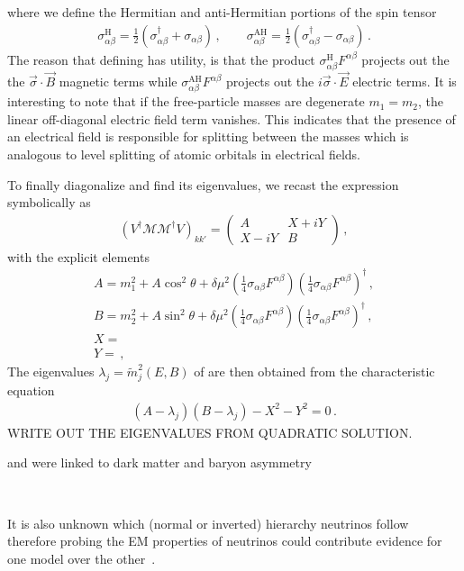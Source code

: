 where we define the Hermitian and anti-Hermitian portions of the spin tensor
\begin{align}
    \label{antiherm:1}
    \sigma_{\alpha\beta}^\mathrm{H}=\frac{1}{2}\left(\sigma_{\alpha\beta}^{\dag} + \sigma_{\alpha\beta}\right)\,,\qquad
    \sigma_{\alpha\beta}^\mathrm{AH}=\frac{1}{2}\left(\sigma_{\alpha\beta}^{\dag} - \sigma_{\alpha\beta}\right)\,.
\end{align}
The reason that defining  has utility, is that the product $\sigma_{\alpha\beta}^\mathrm{H}F^{\alpha\beta}$ projects out the the $\vec{\sigma}\cdot\vec{B}$ magnetic terms while $\sigma_{\alpha\beta}^\mathrm{AH}F^{\alpha\beta}$ projects out the $i\vec{\sigma}\cdot\vec{E}$ electric terms. It is interesting to note that if the free-particle masses are degenerate $m_{1}=m_{2}$, the linear off-diagonal electric field term vanishes. This indicates that the presence of an electrical field is responsible for splitting between the masses which is analogous to level splitting of atomic orbitals in electrical fields.

To finally diagonalize  and find its eigenvalues, we recast the expression symbolically as
\begin{align}
    \label{hermz:5}
    (V^{\dag}\mathcal{M}\mathcal{M}^{\dag}V)_{kk'} =
    \begin{pmatrix}
        A & X+iY\\
        X-iY & B
    \end{pmatrix}\,,
\end{align}
with the explicit elements
\begin{align}
    A = m_{1}^{2}+A\cos^{2}\theta+\delta\mu^{2}\left(\frac{1}{4}\sigma_{\alpha\beta}F^{\alpha\beta}\right)\left(\frac{1}{4}\sigma_{\alpha\beta}F^{\alpha\beta}\right)^{\dag}\,,\\
    B = m_{2}^{2}+A\sin^{2}\theta+\delta\mu^{2}\left(\frac{1}{4}\sigma_{\alpha\beta}F^{\alpha\beta}\right)\left(\frac{1}{4}\sigma_{\alpha\beta}F^{\alpha\beta}\right)^{\dag}\,,\\
    X = \\
    Y =\,,
\end{align}
The eigenvalues $\lambda_{j}=\widetilde m_{j}^{2}(E,B)$ of  are then obtained from the characteristic equation
\begin{align}
    (A-\lambda_{j})(B-\lambda_{j})-X^{2}-Y^{2}=0\,.
\end{align}
WRITE OUT THE EIGENVALUES FROM QUADRATIC SOLUTION.


 and were linked to dark matter and baryon asymmetry~\cite{Asaka:2005pn,Boyarsky:2009ix}

~\cite{DUNE:2020fgq}

  

It is also unknown which (normal or inverted) hierarchy neutrinos follow therefore probing the EM properties of neutrinos could contribute evidence for one model over the other~\cite{Kouzakov:2023jtt}. 